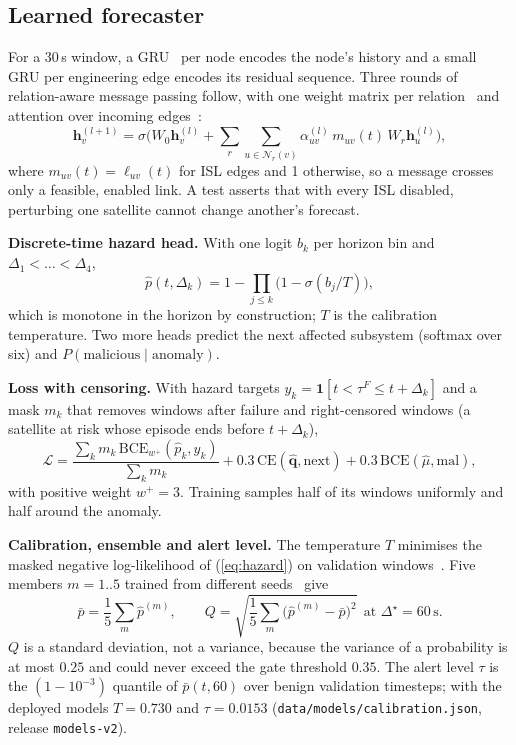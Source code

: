 \documentclass[conference]{IEEEtran}
\newcommand{\file}[1]{\texttt{#1}}
\begin{document}
\subsection{Learned forecaster}
For a 30\,s window, a GRU~\cite{cho2014gru} per node encodes the node's history and a small GRU per
engineering edge encodes its residual sequence. Three rounds of relation-aware message passing follow,
with one weight matrix per relation~\cite{schlichtkrull2018rgcn} and attention over incoming
edges~\cite{velickovic2018gat}:
\begin{equation}
\mathbf{h}^{(l+1)}_v = \sigma\Big(W_0\mathbf{h}^{(l)}_v + \sum_{r}\sum_{u\in\mathcal{N}_r(v)}
\alpha^{(l)}_{uv}\, m_{uv}(t)\, W_r \mathbf{h}^{(l)}_u\Big),
\label{eq:mp}
\end{equation}
where $m_{uv}(t)=\ell_{uv}(t)$ for ISL edges and 1 otherwise, so a message crosses only a feasible,
enabled link. A test asserts that with every ISL disabled, perturbing one satellite cannot change
another's forecast.

\textbf{Discrete-time hazard head.} With one logit $b_k$ per horizon bin and $\Delta_1<\dots<\Delta_4$,
\begin{equation}
\hat p(t,\Delta_k) = 1-\prod_{j\le k}\big(1-\sigma(b_j/T)\big),
\label{eq:hazard}
\end{equation}
which is monotone in the horizon by construction; $T$ is the calibration temperature. Two more heads
predict the next affected subsystem (softmax over six) and $P(\text{malicious}\mid\text{anomaly})$.

\textbf{Loss with censoring.} With hazard targets $y_{k}=\mathbf{1}[t<\tau^F\le t+\Delta_k]$ and a mask
$m_k$ that removes windows after failure and right-censored windows (a satellite at risk whose episode
ends before $t+\Delta_k$),
\begin{equation}
\mathcal{L} = \frac{\sum_k m_k\,\mathrm{BCE}_{w^+}(\hat p_k, y_k)}{\sum_k m_k}
+ 0.3\,\mathrm{CE}(\hat{\mathbf{q}}, \mathrm{next}) + 0.3\,\mathrm{BCE}(\hat\mu, \mathrm{mal}),
\label{eq:loss}
\end{equation}
with positive weight $w^+=3$. Training samples half of its windows uniformly and half around the
anomaly.

\textbf{Calibration, ensemble and alert level.} The temperature $T$ minimises the masked negative
log-likelihood of (\ref{eq:hazard}) on validation windows~\cite{guo2017calibration}. Five members
$m=1..5$ trained from different seeds~\cite{lakshminarayanan2017ensembles} give
\begin{equation}
\bar p = \frac{1}{5}\sum_{m}\hat p^{(m)},\qquad
Q = \sqrt{\frac{1}{5}\sum_m \big(\hat p^{(m)}-\bar p\big)^2}\ \ \text{at } \Delta^\star=60\,\mathrm{s}.
\label{eq:ensemble}
\end{equation}
$Q$ is a standard deviation, not a variance, because the variance of a probability is at most $0.25$
and could never exceed the gate threshold $0.35$. The alert level $\tau$ is the $(1-10^{-3})$ quantile
of $\bar p(t,60)$ over benign validation timesteps; with the deployed models $T=0.730$ and
$\tau=0.0153$ (\file{data/models/calibration.json}, release \texttt{models-v2}).
\end{document}
